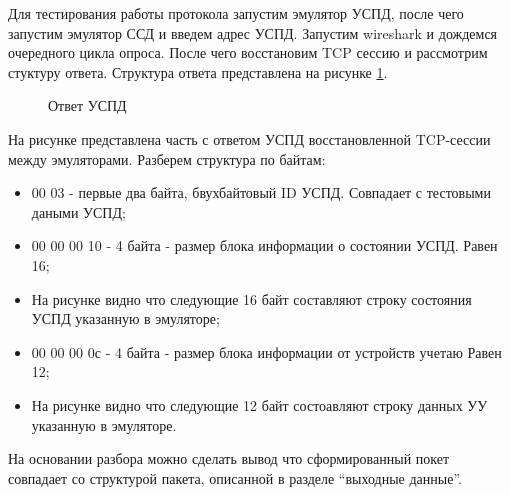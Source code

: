 Для тестирования работы протокола запустим эмулятор УСПД, после чего запустим эмулятор ССД и введем адрес УСПД. Запустим wireshark\cite{nix} и дождемся очередного цикла опроса. После чего восстановим TCP сессию и рассмотрим стуктуру ответа. Структура ответа представлена на рисунке \ref{img:test_pachete}.

\begin{figure}[ht!]
 \caption{Ответ УСПД}
 \label{img:test_pachete}
\end{figure}

На рисунке представлена часть с ответом УСПД восстановленной TCP-сессии между эмуляторами. Разберем структура по байтам:

\begin{itemize}
 \item 00 03 - первые два байта, бвухбайтовый ID УСПД. Совпадает с тестовыми даными УСПД;
 \item 00 00 00 10 - 4 байта - размер блока информации о состоянии УСПД. Равен 16;
 \item На рисунке видно что следующие 16 байт составляют строку состояния УСПД указанную в эмуляторе;
 \item 00 00 00 0с - 4 байта - размер блока информации от устройств учетаю Равен 12;
 \item На рисунке видно что следующие 12 байт состоавляют строку данных УУ указанную в эмуляторе.
\end{itemize}

На основании разбора можно сделать вывод что сформированный покет совпадает со структурой пакета, описанной в разделе ``выходные данные''.